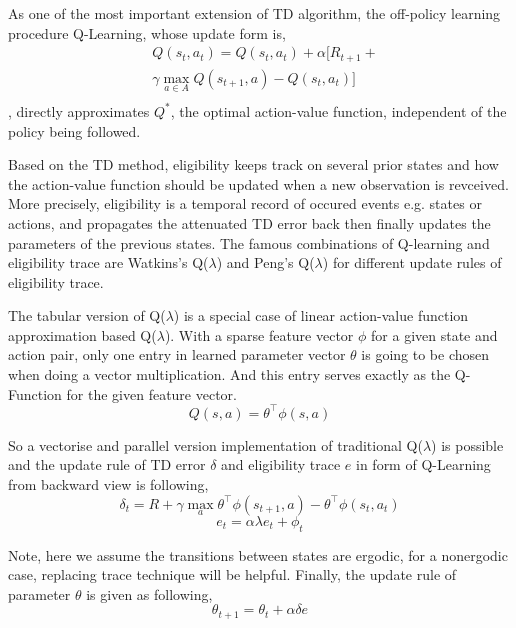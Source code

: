 \documentclass[conference]{IEEEtran}
\begin{document}
As one of the most important extension of TD algorithm, the off-policy learning procedure Q-Learning\cite{watkins1992q}, whose update form is,
\begin{equation}
  \begin{split}
    &Q(s_t, a_t) = Q(s_t, a_t) + \alpha [R_{t+1} + \\
    &\gamma \max_{a\in A}Q(s_{t+1}, a) - Q(s_t, a_t)]\\
  \end{split}  
\end{equation}
, directly approximates $Q^*$, the optimal action-value function, independent of the policy being followed.

Based on the TD method, eligibility keeps track on several prior states and how the action-value function should be updated when a new observation is revceived. More precisely, eligibility is a temporal record of occured events e.g. states or actions, and propagates the attenuated TD error back then finally updates the parameters of the previous states. The famous combinations of Q-learning and eligibility trace are Watkins’s Q($\lambda$) \cite{watkins1992q} and Peng’s Q($\lambda$) \cite{peng1996incremental} for different update rules of eligibility trace. 

The tabular version of Q($\lambda$) is a special case of linear action-value function approximation based Q($\lambda$). With a sparse feature vector $\phi$ for a given state and action pair, only one entry in learned parameter vector $\theta$ is going to be chosen when doing a vector multiplication. And this entry serves exactly as the Q-Function for the given feature vector.
\begin{equation}
  Q(s, a) = \theta^\top  \phi(s, a)
\end{equation}

So a vectorise and parallel version implementation of traditional Q($\lambda$) is possible and the update rule of TD error $\delta$ and eligibility trace $e$ in form of Q-Learning from backward view is following,
\begin{equation}
  \delta_t = R + \gamma \max_a \theta^\top  \phi(s_{t+1}, a) - \theta^\top  \phi(s_t, a_t)
\end{equation}
\begin{equation}
  e_t = \alpha \lambda e_t + \phi_t
\end{equation}

Note, here we assume the transitions between states are ergodic, for a nonergodic case, replacing trace technique will be helpful. Finally, the update rule of parameter $\theta$ is given as following,
\begin{equation}
  \theta_{t+1} = \theta_t + \alpha \delta e
\end{equation}
\end{document}
